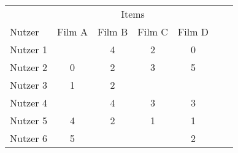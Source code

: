 \begin{tabular}{lcccccc}
    \toprule
    & \multicolumn{4}{c}{Items} \\
    \cmidrule(lr){2-5}
    Nutzer & Film A & Film B & Film C & Film D \\ 
    \midrule
    Nutzer 1 &  & 4 & 2 & 0 \\
    Nutzer 2 & 0 & 2 & 3 & 5 \\
    Nutzer 3 & 1 & 2 &  &  \\
    Nutzer 4 &  & 4 & 3 & 3 \\
    Nutzer 5 & 4 & 2 & 1 & 1 \\
    Nutzer 6 & 5 &  &  & 2 \\
    \bottomrule
\end{tabular}
